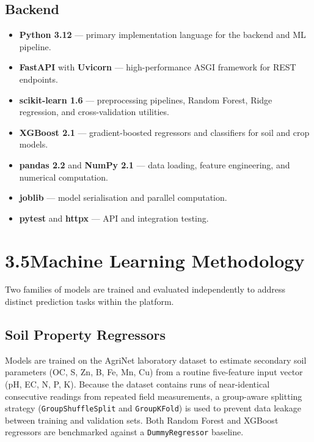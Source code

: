 \documentclass[12pt,a4paper]{article}
\begin{document}
\subsection*{Backend}
\begin{itemize}
  \item \textbf{Python 3.12} --- primary implementation language for the
        backend and ML pipeline.
  \item \textbf{FastAPI} with \textbf{Uvicorn} --- high-performance ASGI
        framework for REST endpoints.
  \item \textbf{scikit-learn 1.6} --- preprocessing pipelines, Random Forest,
        Ridge regression, and cross-validation utilities.
  \item \textbf{XGBoost 2.1} --- gradient-boosted regressors and classifiers
        for soil and crop models.
  \item \textbf{pandas 2.2} and \textbf{NumPy 2.1} --- data loading, feature
        engineering, and numerical computation.
  \item \textbf{joblib} --- model serialisation and parallel computation.
  \item \textbf{pytest} and \textbf{httpx} --- API and integration testing.
\end{itemize}

\section{3.5\quad Machine Learning Methodology}

Two families of models are trained and evaluated independently to address
distinct prediction tasks within the platform.

\subsection*{Soil Property Regressors}

Models are trained on the AgriNet laboratory dataset to estimate secondary soil
parameters (OC, S, Zn, B, Fe, Mn, Cu) from a routine five-feature input
vector (pH, EC, N, P, K).  Because the dataset contains runs of near-identical
consecutive readings from repeated field measurements, a group-aware splitting
strategy (\texttt{GroupShuffleSplit} and \texttt{GroupKFold}) is used to
prevent data leakage between training and validation sets.  Both Random Forest
and XGBoost regressors are benchmarked against a \texttt{DummyRegressor}
baseline.
\end{document}
